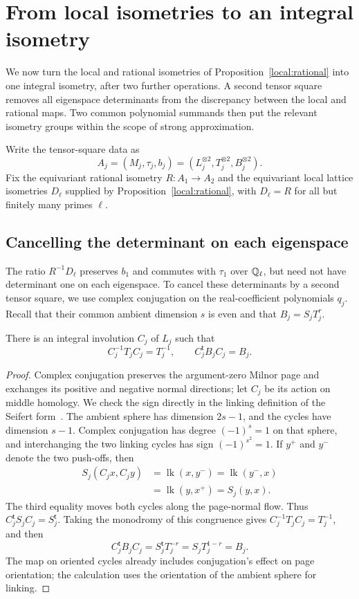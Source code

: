 \section{From local isometries to an integral isometry}
\label{global:section}

We now turn the local and rational isometries of
Proposition~\ref{local:rational} into one integral isometry, after two
further operations.  A second tensor square removes all eigenspace
determinants from the discrepancy between the local and rational maps.
Two common polynomial summands then put the relevant isometry groups
within the scope of strong approximation.

Write the tensor-square data as
\[
 A_j=(M_j,\tau_j,b_j)
     =(L_j^{\otimes2},T_j^{\otimes2},B_j^{\otimes2}).
\]
Fix the equivariant rational isometry $R:A_1\longrightarrow A_2$ and
the equivariant local lattice isometries $D_\ell$ supplied by
Proposition~\ref{local:rational}, with $D_\ell=R$ for all but finitely
many primes $\ell$.

\subsection{Cancelling the determinant on each eigenspace}

The ratio $R^{-1}D_\ell$ preserves $b_1$ and commutes with $\tau_1$
over $\mathbb Q_\ell$, but need not have determinant one on each eigenspace.
To cancel these
determinants by a second tensor square, we use complex conjugation on
the real-coefficient polynomials $q_j$.  Recall that their common
ambient dimension $s$ is even and that $B_j=S_jT_j^r$.

\begin{lemma}\label{local:reverser}
There is an integral involution $C_j$ of $L_j$ such that
\[
 C_j^{-1}T_jC_j=T_j^{-1},\qquad C_j^{\mathsf t}B_jC_j=B_j.
\]
\end{lemma}

\begin{proof}
Complex conjugation preserves the argument-zero Milnor page and
exchanges its positive and negative normal directions; let $C_j$ be
its action on middle homology.  We check the sign directly in the
linking definition of the Seifert form~\cite{Milnor1968}.
The ambient sphere has dimension $2s-1$, and the cycles have dimension
$s-1$.  Complex conjugation has degree $(-1)^s=1$ on that sphere, and
interchanging the two linking cycles has sign $(-1)^{s^2}=1$.
If $y^+$ and $y^-$ denote the two push-offs, then
\[
 \begin{aligned}
 S_j(C_jx,C_jy)
 &=\operatorname{lk}(x,y^-)
  =\operatorname{lk}(y^-,x)\\
 &=\operatorname{lk}(y,x^+)=S_j(y,x).
 \end{aligned}
\]
The third equality moves both cycles along the page-normal flow.
Thus $C_j^{\mathsf t}S_jC_j=S_j^{\mathsf t}$.  Taking the monodromy
of this congruence gives $C_j^{-1}T_jC_j=T_j^{-1}$, and then
\[
 C_j^{\mathsf t}B_jC_j
   =S_j^{\mathsf t}T_j^{-r}=S_jT_j^{1-r}=B_j.
\]
The map on oriented cycles already includes conjugation's effect on
page orientation; the calculation uses the orientation of the ambient
sphere for linking.
\end{proof}

